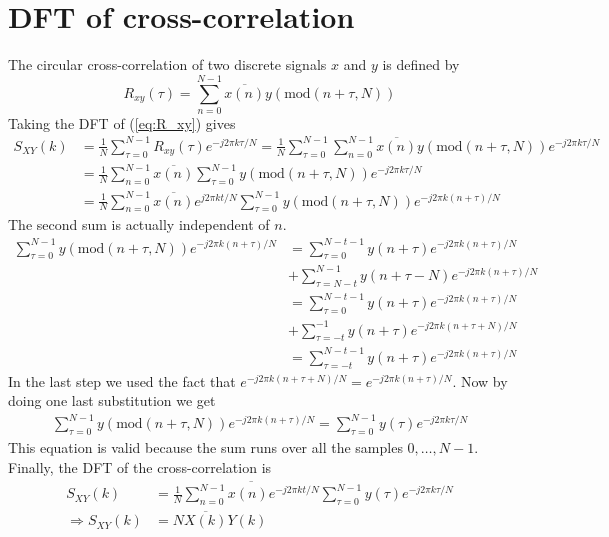 \section{DFT of cross-correlation}
\label{appendix:DFT_cross}
The circular cross-correlation of two discrete signals $x$ and $y$ is defined by \cite[eq. (2.22) ]{Wang_crosscorrelation}
\begin{equation}
    R_{xy}(\tau) = \sum_{n = 0}^{N-1} \overline{x(n)} y(\text{mod}(n+\tau,N)) 
    \label{eq:R_xy}
\end{equation}
Taking the DFT of (\ref{eq:R_xy}) gives
\begin{align*}
    S_{XY}(k) &= \frac{1}{N}\sum_{\tau = 0}^{N-1} R_{xy}(\tau) e^{-j2\pi k \tau /N} = \frac{1}{N}\sum_{\tau = 0}^{N-1} \sum_{n = 0}^{N-1} \overline{x(n)} y(\text{mod}(n+\tau,N))  e^{-j2\pi k \tau /N}\\
    &= \frac{1}{N}\sum_{n = 0}^{N-1} \overline{x(n)} \sum_{\tau = 0}^{N-1} y(\text{mod}(n+\tau,N))  e^{-j2\pi k \tau /N} \\
    &= \frac{1}{N}\sum_{n = 0}^{N-1} \overline{x(n)} e^{j2\pi k t/N} \sum_{\tau = 0}^{N-1} y(\text{mod}(n+\tau,N))  e^{-j2\pi k (n+\tau) /N}
\end{align*}
The second sum is actually independent of $n$.
\begin{align*}
    \sum_{\tau = 0}^{N-1} y(\text{mod}(n+\tau,N))  e^{-j2\pi k (n+\tau) /N} &= \sum_{\tau = 0}^{N-t-1} y(n+\tau)  e^{-j2\pi k (n+\tau) /N}\\ & + \sum_{\tau = N-t}^{N-1} y(n+\tau-N)  e^{-j2\pi k (n+\tau) /N} \\
    &= \sum_{\tau = 0}^{N-t-1} y(n+\tau)  e^{-j2\pi k (n+\tau) /N}\\ & + \sum_{\tau = -t}^{-1} y(n+\tau)  e^{-j2\pi k (n+\tau+N) /N} \\
    & = \sum_{\tau = -t}^{N-t-1} y(n+\tau)  e^{-j2\pi k (n+\tau) /N}
\end{align*}
In the last step we used the fact that $e^{-j2\pi k (n+\tau+N) /N} = e^{-j2\pi k (n+\tau) /N}$. Now by doing one last substitution we get
\begin{align*}
    \sum_{\tau = 0}^{N-1} y(\text{mod}(n+\tau,N))  e^{-j2\pi k (n+\tau) /N} = \sum_{\tau = 0}^{N-1} y(\tau) e^{-j2\pi k \tau /N}
\end{align*}
This equation is valid because the sum runs over all the samples $0,\ldots,N-1$. Finally, the DFT of the cross-correlation is
\begin{align*}
    S_{XY}(k) &= \frac{1}{N} \overline{\sum_{n = 0}^{N-1} x(n) e^{-j2\pi k t/N}} \sum_{\tau = 0}^{N-1} y(\tau)  e^{-j2\pi k \tau /N} \\
    \Rightarrow S_{XY}(k) &=  N \overline{X(k)} Y(k)
\end{align*}

